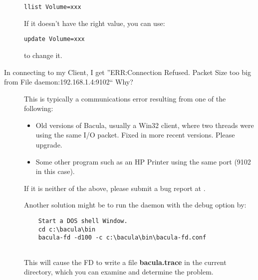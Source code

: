 \begin{description}
\footnotesize
\begin{verbatim}
llist Volume=xxx
\end{verbatim}
\normalsize

If it doesn't have the right value, you can use: 

\footnotesize
\begin{verbatim}
update Volume=xxx
\end{verbatim}
\normalsize

to change it.  

\label{ConnectionRefused}
\item [In connecting to my Client, I get ''ERR:Connection Refused.  Packet
   Size too big from File daemon:192.168.1.4:9102`` Why?]
   This is typically a communications error resulting  from one of the following:
 

\begin{itemize}
\item Old versions of Bacula, usually a Win32 client, where two  threads were
   using the same I/O packet. Fixed in more recent  versions. Please upgrade.  
\item Some other program such as an HP Printer using the same  port (9102 in
   this case).  
\end{itemize}

If it is neither of the above, please submit a bug report at  
.  

Another solution might be to run the daemon with the debug  option by:  

\footnotesize
\begin{verbatim}
    Start a DOS shell Window.
    cd c:\bacula\bin
    bacula-fd -d100 -c c:\bacula\bin\bacula-fd.conf
    
\end{verbatim}
\normalsize

This will cause the FD to write a file {\bf bacula.trace}  in the current
directory, which you can examine and determine  the problem.  

\end{description}
